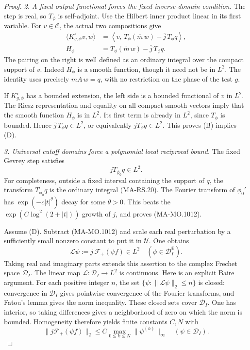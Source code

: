 \begin{proof}
\emph{2. A fixed output functional forces the fixed
inverse-domain condition.}
The step is real, so \(T_\phi\) is self-adjoint.
Use the Hilbert inner product linear in its first
variable.  For \(v\in\mathscr C\), the actual two
compositions give
\[
 \begin{split}
 \langle K^\circ_{g,\phi}v,w\rangle
 &=\left\langle v,\,
       T_\phi(\overline m\,w)
            -\overline j\,T_\phi q\right\rangle,\\
 H_\phi&=T_\phi(\overline m\,w)
            -\overline j\,T_\phi q .
 \end{split}
\tag{MA-MO.1011}
\]
The pairing on the right is well defined as an
ordinary integral over the compact support of \(v\).
Indeed \(H_\phi\) is a smooth function, though it
need not be in \(L^2\).  The identity uses precisely
\(\overline{mA}\,w=q\), with no restriction on the
phase of the test \(g\).

If \(K^\circ_{g,\phi}\) has a bounded extension,
the left side is a bounded functional of \(v\)
in \(L^2\).  The Riesz representation and equality
on all compact smooth vectors imply that the
smooth function \(H_\phi\) is in \(L^2\).
Its first term is already in \(L^2\), since
\(T_\phi\) is bounded.  Hence
\(\overline j\,T_\phi q\in L^2\), or equivalently
\(jT_\phi q\in L^2\).  This proves (B) implies (D).

\emph{3. Universal cutoff domains force a polynomial
local reciprocal bound.}
The fixed Gevrey step satisfies
\[
                 jT_{\phi_0}q\in L^2 .
\tag{MA-MO.1012}
\]
For completeness, outside a fixed interval containing
the support of \(q\), the transform \(T_{\phi_0}q\)
is the ordinary integral (MA-RS.20).  The Fourier
transform of \(\phi_0'\) has
\(\exp(-c|t|^\theta)\) decay for some \(\theta>0\).
This beats the \(\exp(C\log^2(2+|t|))\) growth
of \(j\), and proves (MA-MO.1012).

Assume (D).  Subtract (MA-MO.1012) and scale each
real perturbation by a sufficiently small nonzero
constant to put it in \(\mathscr U\).  One obtains
\[
 \mathcal L\psi
       :=j\,\mathcal F_+(\psi f)\in L^2
                  \quad(\psi\in\mathscr D_I^\mathbb R).
\tag{MA-MO.1013}
\]
Taking real and imaginary parts extends this
assertion to the complex Frechet space \(\mathscr D_I\).
The linear map \(\mathcal L:\mathscr D_I\to L^2\)
is continuous.  Here is an explicit Baire argument.
For each positive integer \(n\), the set
\(\{\psi:\|\mathcal L\psi\|_2\le n\}\) is closed:
convergence in \(\mathscr D_I\) gives pointwise
convergence of the Fourier transforms, and Fatou's
lemma gives the norm inequality.  These closed
sets cover \(\mathscr D_I\).  One has interior,
so taking differences gives a neighborhood of
zero on which the norm is bounded.  Homogeneity
therefore yields finite constants \(C,N\) with
\[
 \|j\mathcal F_+(\psi f)\|_2
       \le C\max_{0\le k\le N}\|\psi^{(k)}\|_\infty
                         \quad(\psi\in\mathscr D_I).
\tag{MA-MO.1014}
\]


\end{proof}

